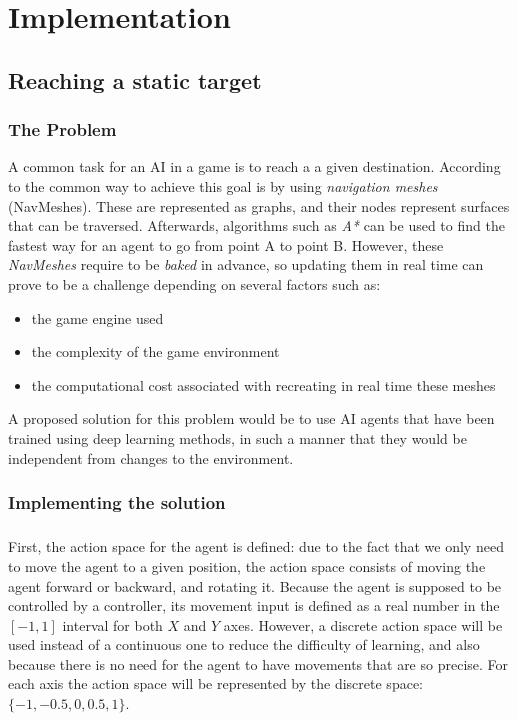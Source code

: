 \chapter{Implementation}
\section{Reaching a static target}
\subsection{The Problem} \label{static_target:the_problem}
A common task for an AI in a game is to reach a a given destination. According to \cite{alonso2020deeplearningnavigation} the common way to achieve this goal is by using \emph{navigation meshes} (NavMeshes). These are represented as graphs, and their nodes represent surfaces that can be traversed. Afterwards, algorithms such as \emph{A*} can be used to find the fastest way for an agent to go from point A to point B. However, these \emph{NavMeshes} require to be \emph{baked} in advance, so updating them in real time can prove to be a challenge depending on several factors such as:
\begin{itemize}
    \item the game engine used
    \item the complexity of the game environment
    \item the computational cost associated with recreating in real time these meshes
\end{itemize}

A proposed solution for this problem would be to use AI agents that have been trained using deep learning methods, in such a manner that they would be independent from changes to the environment.

\subsection{Implementing the solution} \label{static_target:implementation}
\paragraph{}
First, the action space for the agent is defined: due to the fact that we only need to move the agent to a given position, the action space consists of moving the agent forward or backward, and rotating it. Because the agent is supposed to be controlled by a controller, its movement input is defined as a real number in the $[-1, 1]$ interval for both $X$ and $Y$ axes. However, a discrete action space will be used instead of a continuous one to reduce the difficulty of learning, and also because there is no need for the agent to have movements that are so precise. For each axis the action space will be represented by the discrete space: $\{-1, -0.5, 0, 0.5, 1\}$.

